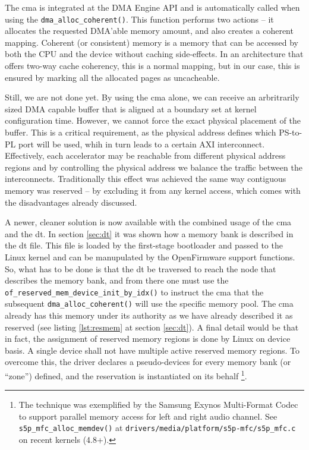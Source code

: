 The \gls{cma} is integrated at the DMA Engine API and is automatically called when using
the \texttt{dma\_alloc\_coherent()}. This function performs two actions -- it allocates
the requested DMA'able memory amount, and also creates a coherent mapping. Coherent
(or consistent) memory is a memory that can be accessed by both the CPU and the device
without caching side-effects. In an architecture that offers two-way cache coherency,
this is a normal mapping, but in our case, this is ensured by marking all the allocated
pages as uncacheable.

Still, we are not done yet. By using the \gls{cma} alone, we can receive an
arbritrarily sized DMA capable buffer that is aligned at a boundary set at kernel configuration time.
However, we cannot force the exact physical placement of the buffer.
This is a critical requirement, as the physical address defines which PS-to-PL port will be used,
whih in turn leads to a certain AXI interconnect. Effectively, each accelerator may be
reachable from different physical address regions and by controlling the physical address
we balance the traffic between the interconnects. Traditionally this effect was achieved
the same way contiguous memory was reserved -- by excluding it from any kernel access,
which comes with the disadvantages already discussed. 

A newer, cleaner solution is now available
with the combined usage of the \gls{cma} and the \gls{dt}.
In section \ref{sec:dt} it was shown how a memory bank is described in the \gls{dt} file.
This file is loaded by the first-stage bootloader and passed to the Linux kernel
and can be manupulated by the OpenFirmware support functions. So, what has to be done
is that the \gls{dt} be traversed to reach the node that describes the memory bank,
and from there one must use the \texttt{of\_reserved\_mem\_device\_init\_by\_idx()}
to instruct the \gls{cma} that the subsequent \texttt{dma\_alloc\_coherent()} will
use the specific memory pool. The \gls{cma} already has this memory under its
authority as we have already described it as reserved (see listing \ref{lst:resmem} at section \ref{sec:dt}).
A final detail would be that in fact, the assignment of reserved memory regions is
done by Linux on device basis. A single device shall not have multiple active
reserved memory regions. To overcome this, the driver declares a pseudo-devices
for every memory bank (or ``zone'') defined, and the reservation is instantiated on its behalf
\footnote{The technique was exemplified by the Samsung Exynos Multi-Format Codec to support
parallel memory access for left and right audio channel. See \texttt{s5p\_mfc\_alloc\_memdev()}
at \texttt{drivers/media/platform/s5p-mfc/s5p\_mfc.c} on recent kernels (4.8+).}.


